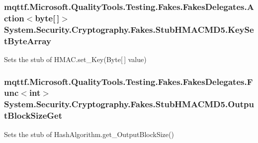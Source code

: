 \hypertarget{class_system_1_1_security_1_1_cryptography_1_1_fakes_1_1_stub_h_m_a_c_m_d5_ace18ac6fbb1913d7459cbd7aecb7a383}{
\subsubsection[{Key\-Set\-Byte\-Array}]{\setlength{\rightskip}{0pt plus 5cm}mqttf.\-Microsoft.\-Quality\-Tools.\-Testing.\-Fakes.\-Fakes\-Delegates.\-Action$<$byte\mbox{[}$\,$\mbox{]}$>$ System.\-Security.\-Cryptography.\-Fakes.\-Stub\-H\-M\-A\-C\-M\-D5.\-Key\-Set\-Byte\-Array}}\label{class_system_1_1_security_1_1_cryptography_1_1_fakes_1_1_stub_h_m_a_c_m_d5_ace18ac6fbb1913d7459cbd7aecb7a383}


Sets the stub of H\-M\-A\-C.\-set\-\_\-\-Key(\-Byte\mbox{[}$\,$\mbox{]} value)

\hypertarget{class_system_1_1_security_1_1_cryptography_1_1_fakes_1_1_stub_h_m_a_c_m_d5_aa58fa6d26184e5b8a29142b58915c7bc}{
\subsubsection[{Output\-Block\-Size\-Get}]{\setlength{\rightskip}{0pt plus 5cm}mqttf.\-Microsoft.\-Quality\-Tools.\-Testing.\-Fakes.\-Fakes\-Delegates.\-Func$<$int$>$ System.\-Security.\-Cryptography.\-Fakes.\-Stub\-H\-M\-A\-C\-M\-D5.\-Output\-Block\-Size\-Get}}\label{class_system_1_1_security_1_1_cryptography_1_1_fakes_1_1_stub_h_m_a_c_m_d5_aa58fa6d26184e5b8a29142b58915c7bc}


Sets the stub of Hash\-Algorithm.\-get\-\_\-\-Output\-Block\-Size()



